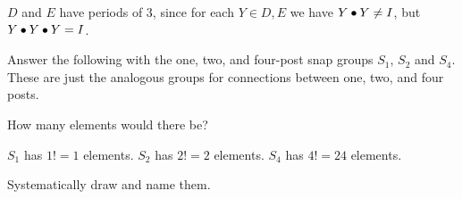 \documentclass[../key.tex]{subfiles}
\begin{document}
\noindent $D$ and $E$ have periods of $3$, since for each $Y\in {D,E}$ we have $Y\bullet Y\neq I$, but $Y\bullet Y\bullet Y=I$.

\begin{outer_problem}
\item Answer the following with the one, two, and four-post snap groups $S_1$, $S_2$ and $S_4$. These are just the analogous groups for connections between one, two, and four posts.
\end{outer_problem}

\begin{inner_problem}[start=1]
	\item How many elements would there be?
\end{inner_problem}

\noindent $S_1$ has $1!=1$ elements. $S_2$ has $2!=2$ elements. $S_4$ has $4!=24$ elements.

\begin{inner_problem}
	\item Systematically draw and name them.
\end{inner_problem}
\end{document}
